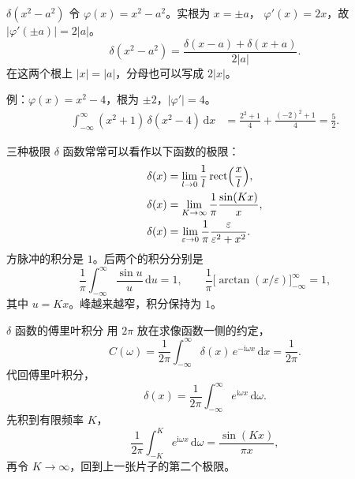 \documentclass[fontset=windows, chinese, 10pt, xcolor=dvipsnames]{beamer}
\begin{document}
\begin{frame}{$\delta(x^2-a^2)$}
  令 $\varphi(x)=x^2-a^2$。实根为 $x=\pm a$，
  $\varphi'(x)=2x$，故 $|\varphi'(\pm a)|=2|a|$。
  \begin{equation*}
    \delta(x^2-a^2)
    =\frac{\delta(x-a)+\delta(x+a)}{2|a|}.
  \end{equation*}
  在这两个根上 $|x|=|a|$，分母也可以写成 $2|x|$。
  \vspace{0.4em}

  例：$\varphi(x)=x^2-4$，根为 $\pm 2$，$|\varphi'|=4$。
  \begin{align*}
    \int_{-\infty}^{\infty}(x^2+1)\,\delta(x^2-4)\,\mathrm{d}x
    &=\frac{2^2+1}{4}+\frac{(-2)^2+1}{4}
     =\frac{5}{2}.
  \end{align*}
\end{frame}

\begin{frame}{三种极限}
  $\delta$ 函数常常可以看作以下函数的极限：
  \begin{align*}
    \delta(x)
      &=\lim_{l\to 0}\frac{1}{l}\,\mathrm{rect}\Bigl(\frac{x}{l}\Bigr),\\
    \delta(x)
      &=\lim_{K\to\infty}\frac{1}{\pi}\frac{\sin(Kx)}{x},\\
    \delta(x)
      &=\lim_{\varepsilon\to 0}
        \frac{1}{\pi}\frac{\varepsilon}{\varepsilon^2+x^2}.
  \end{align*}
  方脉冲的积分是 $1$。后两个的积分分别是
  \begin{equation*}
    \frac{1}{\pi}\int_{-\infty}^{\infty}\frac{\sin u}{u}\,\mathrm{d}u=1,
    \qquad
    \frac{1}{\pi}\bigl[\arctan(x/\varepsilon)\bigr]_{-\infty}^{\infty}=1,
  \end{equation*}
  其中 $u=Kx$。峰越来越窄，积分保持为 $1$。
\end{frame}

\begin{frame}{$\delta$ 函数的傅里叶积分}
  用 $2\pi$ 放在求像函数一侧的约定，
  \begin{equation*}
    C(\omega)
    =\frac{1}{2\pi}\int_{-\infty}^{\infty}
      \delta(x)\,e^{-\mathrm{i}\omega x}\,\mathrm{d}x
    =\frac{1}{2\pi}.
  \end{equation*}
  代回傅里叶积分，
  \begin{equation*}
    \delta(x)=\frac{1}{2\pi}\int_{-\infty}^{\infty}
      e^{\mathrm{i}\omega x}\,\mathrm{d}\omega.
  \end{equation*}
  先积到有限频率 $K$，
  \begin{equation*}
    \frac{1}{2\pi}\int_{-K}^{K} e^{\mathrm{i}\omega x}\,\mathrm{d}\omega
    =\frac{\sin(Kx)}{\pi x},
  \end{equation*}
  再令 $K\to\infty$，回到上一张片子的第二个极限。
\end{frame}
\end{document}
